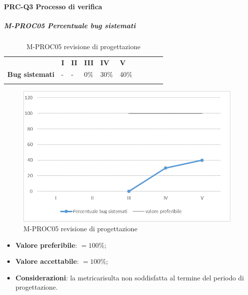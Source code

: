 \paragraph*{PRC-Q3 Processo di verifica}
\subparagraph{M-PROC05 Percentuale bug sistemati} \mbox{}
\begin{longtable}[H!] {						
		>{}p{50mm}  		
		>{}p{8mm}
		>{}p{8mm}		
		>{}p{8mm}		
		>{}p{8mm}		
		>{}p{8mm}		
		>{}p{8mm}
		>{}p{8mm}
		>{}p{8mm}
		>{}p{8mm}
	}
	\rowcolor{gray!50}
	\textbf{} & \textbf{I} & \textbf{II} & \textbf{III} & \textbf{IV} & \textbf{V} \TBstrut \\ [2mm]
	\textbf{Bug sistemati} & - & - & 0\% & 30\% & 40\% \TBstrut \\ [2mm]
	\rowcolor{white}
	\caption{M-PROC05 revisione di progettazione\glo}
\end{longtable}
\begin{figure}[H] 	
	\includegraphics[width=\linewidth]{./img/grafici/RP16.png}	
	\caption{M-PROC05 revisione di progettazione\glo}	
\end{figure}
\begin{itemize}
	\item \textbf{Valore preferibile}: $=100\%$;
	\item \textbf{Valore accettabile}: $=100\%$;
	\item \textbf{Considerazioni}: la metrica\glosp risulta non soddisfatta al termine del periodo di progettazione\glo.
\end{itemize}

